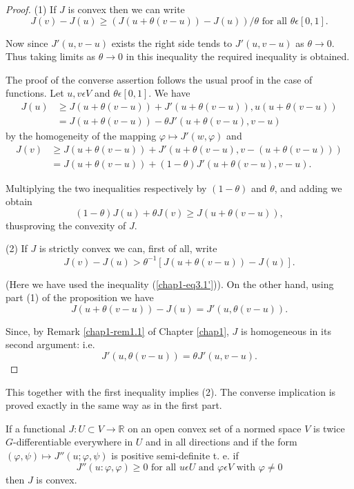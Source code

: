 \begin{proof}
(1) If $J$ is convex then we can write
$$
J(v) - J(u) \geq (J(u + \theta(v - u)) - J(u))/\theta \text{ for all } \theta \epsilon [0, 1].
$$

Now since $J'(u, v-u)$ exists the right side tends to $J'(u, v-u)$ as $\theta \to 0$. Thus taking limits as $\theta \to 0$ in this inequality the required inequality is obtained.

The proof of the converse assertion follows the usual proof in the case of functions. Let $u, v \epsilon V$ and $\theta \epsilon [0, 1]$. We have
\begin{align*}
J(u) & \geq J(u + \theta(v-u)) + J'(u + \theta(v-u)), u(u + \theta(v-u))\\
& = J(u + \theta(v-u)) - \theta J'(u + \theta(v-u), v-u)
\end{align*}
by the homogeneity of the mapping $\varphi \mapsto J'(w, \varphi)$ and
\begin{align*}
J(v) & \geq J(u + \theta(v-u)) + J'(u + \theta(v-u), v-(u + \theta(v - u)))\\
& = J(u + \theta(v-u)) + (1 - \theta) J'(u + \theta(v - u), v-u).
\end{align*}

Multiplying the two inequalities respectively by $(1 - \theta)$ and $\theta$, and adding we obtain
$$
(1 - \theta) J(u) + \theta J(v) \geq J(u + \theta(v-u)),
$$
thus\pageoriginale proving the convexity of $J$.

(2) If $J$ is strictly convex we can, first of all, write
$$
J(v) - J(u) > \theta^{-1} [J(u + \theta(v-u)) - J(u)].
$$

(Here we have used the inequality (\ref{chap1-eq3.1'})). On the other hand, using part (1) of the proposition we have
$$
J(u + \theta(v-u)) - J(u) = J'(u, \theta(v - u)).
$$

Since, by Remark \ref{chap1-rem1.1} of Chapter \ref{chap1}, $J$ is homogeneous in its second argument: i.e.
$$
J'(u, \theta(v-u)) = \theta J'(u, v-u).
$$
\end{proof}

This together with the first inequality implies (2). The converse implication is proved exactly in the same way as in the first part.

\begin{proposition}\label{chap1-prop3.2}
If a functional $J : U \subset V \to \mathbb{R}$ on an open convex set of a normed space $V$ is twice $G$-differentiable everywhere in $U$ and in all directions and if the form $(\varphi, \psi) \mapsto J''(u ; \varphi, \psi)$ is positive semi-definite t. e. if
$$
J''(u: \varphi, \varphi) \geq 0 \text{ for all } u \epsilon U \text{ and } \varphi \epsilon V \text{ with } \varphi \neq 0
$$
then $J$ is convex.
\end{proposition}

